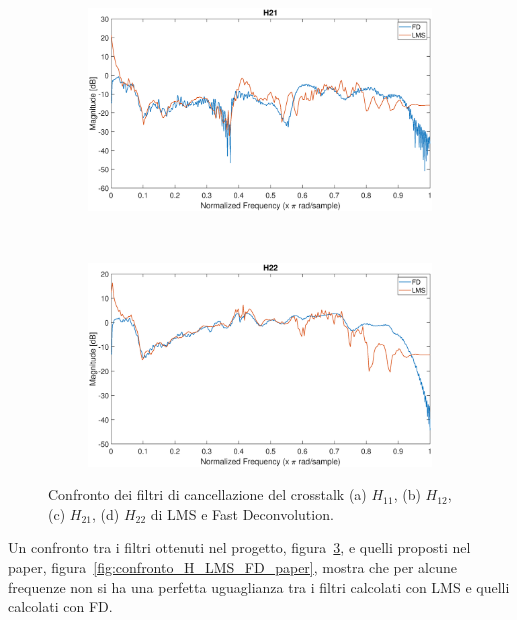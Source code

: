 \documentclass[12pt,a4paper,titlepage]{article}
\begin{document}
\begin{figure}[h]
	\ContinuedFloat
	\centering
	\begin{subfigure}{1\textwidth}
		\includegraphics[width=1\textwidth]{Immagini/H21_FD_LMS}
		\caption{}
		\label{fig:Confronto_H21_LMS_FD}
	\end{subfigure}\\
	\begin{subfigure}{1\textwidth}
		\includegraphics[width=1\textwidth]{Immagini/H22_FD_LMS}
		\caption{}
		\label{fig:Confronto_H22_LMS_FD}
	\end{subfigure}
	\caption{Confronto dei filtri di cancellazione del crosstalk (a) $H_{11}$, (b) $H_{12}$, (c) $H_{21}$, (d) $H_{22}$ di LMS e Fast Deconvolution.}
	\label{fig:confronto_H_LMS_FD}
\end{figure}

Un confronto tra i filtri ottenuti nel progetto, figura~\ref{fig:confronto_H_LMS_FD}, e quelli proposti nel paper, figura~\ref{fig:confronto_H_LMS_FD_paper}, mostra che per alcune frequenze non si ha una perfetta uguaglianza tra i filtri calcolati con LMS e quelli calcolati con FD.
\end{document}
